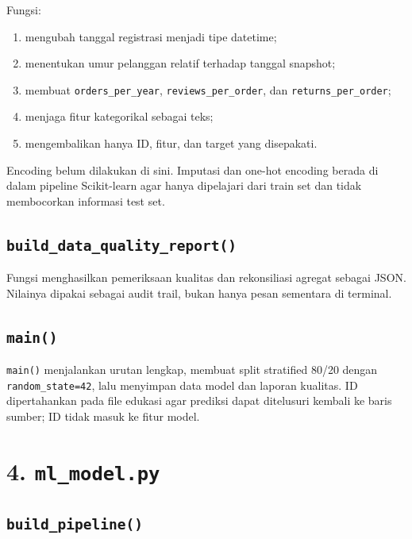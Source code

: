 \documentclass[
  indonesian,
  letterpaper,
  DIV=11,
  numbers=noendperiod]{scrreprt}
\providecommand{\tightlist}{%
  \setlength{\itemsep}{0pt}\setlength{\parskip}{0pt}}
\begin{document}
Fungsi:

\begin{enumerate}
\def\labelenumi{\arabic{enumi}.}
\tightlist
\item
  mengubah tanggal registrasi menjadi tipe datetime;
\item
  menentukan umur pelanggan relatif terhadap tanggal snapshot;
\item
  membuat \texttt{orders\_per\_year}, \texttt{reviews\_per\_order}, dan
  \texttt{returns\_per\_order};
\item
  menjaga fitur kategorikal sebagai teks;
\item
  mengembalikan hanya ID, fitur, dan target yang disepakati.
\end{enumerate}

Encoding belum dilakukan di sini. Imputasi dan one-hot encoding berada
di dalam pipeline Scikit-learn agar hanya dipelajari dari train set dan
tidak membocorkan informasi test set.

\subsection{\texorpdfstring{\texttt{build\_data\_quality\_report()}}{build\_data\_quality\_report()}}\label{build_data_quality_report}

Fungsi menghasilkan pemeriksaan kualitas dan rekonsiliasi agregat
sebagai JSON. Nilainya dipakai sebagai audit trail, bukan hanya pesan
sementara di terminal.

\subsection{\texorpdfstring{\texttt{main()}}{main()}}\label{main}

\texttt{main()} menjalankan urutan lengkap, membuat split stratified
80/20 dengan \texttt{random\_state=42}, lalu menyimpan data model dan
laporan kualitas. ID dipertahankan pada file edukasi agar prediksi dapat
ditelusuri kembali ke baris sumber; ID tidak masuk ke fitur model.

\section{\texorpdfstring{4.
\texttt{ml\_model.py}}{4. ml\_model.py}}\label{ml_model.py}

\subsection{\texorpdfstring{\texttt{build\_pipeline()}}{build\_pipeline()}}\label{build_pipeline}
\end{document}
